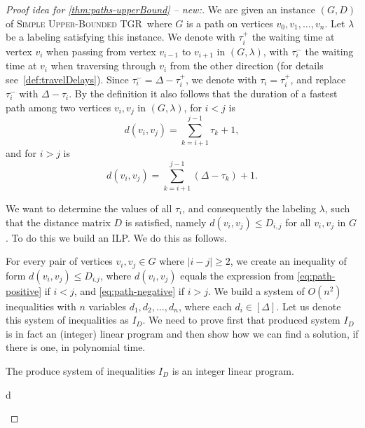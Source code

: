 \documentclass[a4paper,UKenglish,cleveref, autoref, thm-restate]{lipics-v2021}
\newcommand{\deltaUpperBound}{\textsc{Simple Upper-Bounded TGR}}
\begin{document}
\begin{proof}[Proof idea for \cref{thm:paths-upperBound} -- new:]
We are given an instance  $(G,D)$ of \deltaUpperBound\, where $G$ is a path on vertices $v_0, v_1, \dots, v_n$. 
Let $\lambda$ be a labeling satisfying this instance.
We denote with $\tau_i^+$ the waiting time at vertex $v_i$ when passing from vertex $v_{i-1}$ to $v_{i+1}$ in $(G,\lambda)$, with $\tau_i^-$ the waiting time at $v_i$ when traversing through $v_i$ from the other direction (for details see~\cref{def:travelDelays}).
Since $\tau_i^- = \Delta - \tau_i^+$, we denote with $\tau_i = \tau_i^+$, and replace $\tau_i^-$ with $ \Delta - \tau_i$.
By the definition it also follows that the duration of a fastest path among two vertices $v_i, v_j$ in $(G,\lambda)$, for $i < j$
is 
\begin{equation}\label{eq:path-positive}
    d(v_i,v_j)=\sum_{k = i+1}^{j-1} \tau_k + 1,
\end{equation}
and for $i > j$ is 
\begin{equation}\label{eq:path-negative}
d(v_i,v_j)=\sum_{k = i+1}^{j-1} (\Delta - \tau_k) + 1.
\end{equation}

We want to determine the values of all $\tau_i$, and consequently the labeling $\lambda$, such that the distance matrix $D$ is satisfied,
namely $d(v_i,v_j) \leq D_{i,j}$ for all $v_i,v_j$ in $G$.
To do this we build an ILP. We do this as follows.

For every pair of vertices $v_i, v_j \in G$ where $|i-j| \geq 2$, we create an inequality of form $d(v_i,v_j) \leq D_{i.j}$, where $d(v_i,v_j)$ equals the expression from \cref{eq:path-positive} if $i < j$, and \cref{eq:path-negative} if $i > j$.
We build a system of $O(n^2)$ inequalities with $n$ variables $d_1,d_2, \dots, d_n$,
where each $d_i \in [\Delta]$. Let us denote this system of inequalities as $I_D$.
We need to prove first that produced system $I_D$ is in fact an (integer) linear program and then show how we can find a solution, if there is one, in polynomial time.

\begin{claim}
    The produce system of inequalities $I_D$ is an integer linear program.
\end{claim}
\begin{claimproof}
d
\end{claimproof}

\end{proof}
\end{document}
